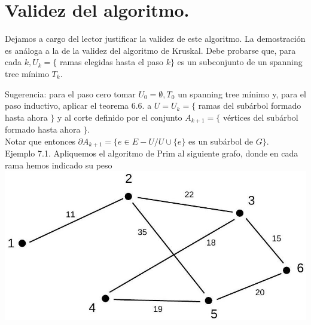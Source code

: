 \documentclass[10pt]{article}
\begin{document}
\section*{Validez del algoritmo.}
Dejamos a cargo del lector justificar la validez de este algoritmo. La demostración es análoga a la de la validez del algoritmo de Kruskal. Debe probarse que, para cada $k, U_{k}=\{$ ramas elegidas hasta el paso $k\}$ es un subconjunto de un spanning tree mínimo $T_{k}$.

Sugerencia: para el paso cero tomar $U_{0}=\emptyset, T_{0}$ un spanning tree mínimo y, para el paso inductivo, aplicar el teorema 6.6. a $U=U_{k}=\{$ ramas del subárbol formado hasta ahora $\}$ y al corte definido por el conjunto $A_{k+1}=\{$ vértices del subárbol formado hasta ahora $\}$.\\
Notar que entonces $\partial A_{k+1}=\{e \in E-U / U \cup\{e\}$ es un subárbol de $G\}$.\\
Ejemplo 7.1. Apliquemos el algoritmo de Prim al siguiente grafo, donde en cada rama hemos indicado su peso\\
\includegraphics[max width=\textwidth, center]{2025_09_05_93c7c1835f249f70c0eeg-25}
\end{document}

